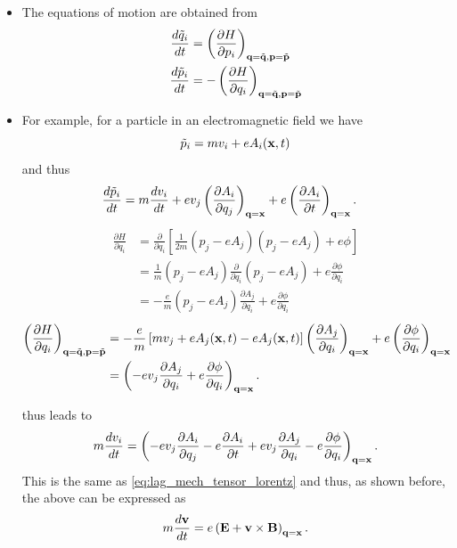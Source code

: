 \documentclass[a4paper,11pt]{report}
\begin{document}
\begin{itemize}
    \item The equations of motion are obtained from
    \begin{align}
    \frac{d \tilde{q}_i}{dt} &= \left ( \frac{ \partial H}{\partial p_i} \right )_{\mathbf{q} = \tilde{\mathbf{q}}, \mathbf{p} = \tilde{\mathbf{p}}} \\
    \frac{d \tilde{p}_i}{dt} & = -\left ( \frac{ \partial H}{\partial q_i} \right )_{\mathbf{q} = \tilde{\mathbf{q}}, \mathbf{p} = \tilde{\mathbf{p}}} \label{eq:hamil_p}
    \end{align}
    
    \item For example, for a particle in an electromagnetic field we have
    \begin{equation}
    \tilde{p}_i = mv_i + e A_i(\mathbf{x},t)
    \end{equation}
    and thus
    \begin{align}
    \frac{d \tilde{p}_i}{dt} & = m \frac{d v_i}{dt} + e v_j \left ( \frac{\partial A_i}{\partial q_j} \right)_{\mathbf{q} = \mathbf{x}} + e \left ( \frac{ \partial A_i}{\partial t} \right)_{\mathbf{q} = \mathbf{x}}.
    \end{align}
    \begin{align}
    \frac{\partial H}{\partial q_i} &= \frac{\partial}{\partial q_i} \left [ \frac{1}{2m} (p_j -eA_j) (p_j -eA_j) + e\phi \right] \nonumber \\
    & = \frac{1}{m} (p_j -eA_j) \frac{\partial}{\partial q_i} (p_j - eA_j) + e\frac{\partial \phi}{\partial q_i} \nonumber \\
    &  = -\frac{e}{m} (p_j - eA_j) \frac{\partial A_j}{\partial q_i} + e \frac{\partial \phi}{\partial q_i}
    \end{align}
    \begin{align}
    \left ( \frac{ \partial H}{\partial q_i} \right )_{\mathbf{q} = \tilde{\mathbf{q}}, \mathbf{p} = \tilde{\mathbf{p}}} &= -\frac{e}{m} \left [ m v_j + eA_j(\mathbf{x},t) - eA_j(\mathbf{x},t) \right ] \left ( \frac{\partial A_j}{\partial q_i} \right)_{\mathbf{q} = \mathbf{x}} + e \left ( \frac{\partial \phi}{\partial q_i} \right)_{\mathbf{q} = \mathbf{x}} \nonumber \\
    & = \left( -e v_j \frac{\partial A_j}{\partial q_i} + e \frac{ \partial \phi}{\partial q_i} \right)_{\mathbf{q} = \mathbf{x}} .
    \end{align}
    
     thus leads to
    \begin{equation}
    m \frac{d v_i}{dt} = \left ( -e v_j \frac{ \partial A_i}{\partial q_j} - e \frac{ \partial A_i}{\partial t} + e v_j \frac{ \partial A_j}{\partial q_i} - e \frac{ \partial \phi}{\partial q_i} \right)_{\mathbf{q} = \mathbf{x}}.
    \end{equation}
    This is the same as \cref{eq:lag_mech_tensor_lorentz} and thus, as shown before, the above can be expressed as
    \begin{equation}
    \label{eq:single_particle_classical_mechanics}
    m \frac{d \mathbf{v}}{dt} = e \left ( \mathbf{E} + \mathbf{v} \times \mathbf{B} \right)_{\mathbf{q} = \mathbf{x}}.
    \end{equation}
    
\end{itemize}
\end{document}
